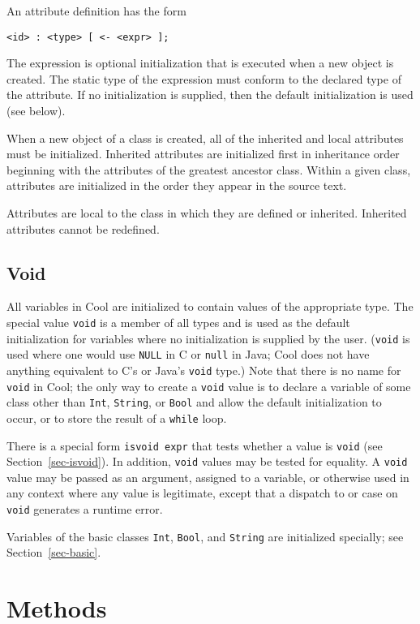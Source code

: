 \documentclass[11pt]{article}
\begin{document}
An attribute definition has the form
\begin{verbatim}
<id> : <type> [ <- <expr> ];
\end{verbatim}
The expression is optional initialization that is executed when a new
object is created.  The static type of the expression must conform to
the declared type of the attribute.  If no initialization is supplied,
then the default initialization is used (see below).

When a new object of a class is created, all of
the inherited and local attributes must be initialized.  Inherited
attributes are initialized first in inheritance order beginning with the
attributes of the greatest ancestor class. Within a given class,
attributes are initialized in the order they appear in the source
text.

 Attributes are local to the class in which they are defined or inherited.
Inherited attributes cannot be redefined.

\subsection{Void}

All variables in Cool are initialized to contain values of the
appropriate type.  The special value {\tt void} is a member of all
types and is used as the default initialization for variables where no
initialization is supplied by the user.  ({\tt void} is used where
one would use {\tt NULL} in C or {\tt null} in Java; Cool does not
have anything equivalent to C's or Java's {\tt void} type.)
Note that there is no name for
{\tt void} in Cool; the only way to create a {\tt void} value is to
declare a variable of some class other than {\tt Int}, {\tt String},
or {\tt Bool} and allow the default initialization to occur, or to
store the result of a {\tt while} loop.


There is a special form {\tt isvoid expr} that tests whether a value
is {\tt void} (see Section~\ref{sec-isvoid}).  In addition, {\tt void}
values may be tested for equality.  A {\tt void} value may be passed as an
argument, assigned to a variable, or otherwise used in any context
where any value is legitimate, except that a dispatch to or case on
{\tt void} generates a runtime error.

Variables of the basic classes {\tt Int}, {\tt Bool}, and {\tt String} are 
initialized specially; see Section~\ref{sec-basic}.

\section{Methods}
\label{sec-method}
\end{document}
